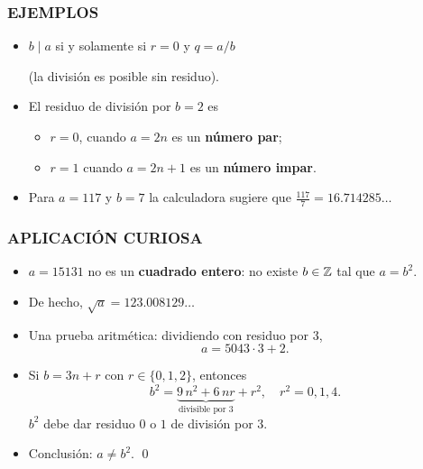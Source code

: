 \begin{frame}
  \frametitle{EJEMPLOS}

  \begin{itemize}
  \item<2-> $b \mid a$ si y solamente si $r = 0$ y $q = a/b$

    (la división es posible sin residuo).

  \item<3-> El residuo de división por $b = 2$ es

    \begin{itemize}
    \item<4-> $r = 0$, cuando $a = 2n$ es un \textbf{número par};
    \item<5-> $r = 1$ cuando $a = 2n+1$ es un \textbf{número impar}.
    \end{itemize}

  \item<6-> Para $a = 117$ y $b = 7$ la calculadora sugiere que
    $\frac{117}{7} = 16.714285\ldots$


  \end{itemize}
\end{frame}

\begin{frame}
  \frametitle{APLICACIÓN CURIOSA}

  \begin{itemize}
  \item<2-> $a = 15131$ no es un \textbf{cuadrado entero}:
    no existe $b \in \mathbb{Z}$ tal que $a = b^2$.

  \item<3-> De hecho, $\sqrt{a} = 123.008129\ldots$

  \item<4-> Una prueba aritmética: dividiendo con residuo por $3$,
    $$a = 5043 \cdot 3 + 2.$$

  \item<5-> Si $b = 3n + r$ con $r \in \{ 0, 1, 2 \}$, entonces
    \[
      b^2 = \underbrace{9\,n^2 + 6\,nr}_{\text{divisible por }3} + r^2,
      \quad
      r^2 = 0, 1, 4.
    \]
    $b^2$ debe dar residuo $0$ o $1$ de división por $3$.

  \item<6-> Conclusión: $a \ne b^2$. \qed
  \end{itemize}
\end{frame}

